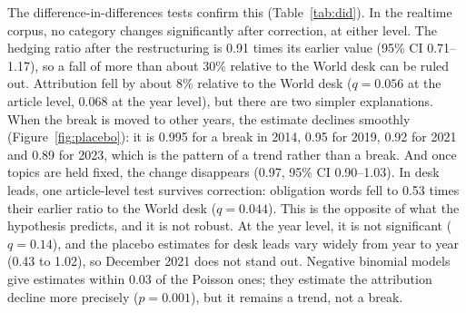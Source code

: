 \documentclass[11pt]{article}
\begin{document}
The difference-in-differences tests confirm this (Table~\ref{tab:did}). In the realtime corpus, no category changes significantly after correction, at either level. The hedging ratio after the restructuring is 0.91 times its earlier value (95\% CI 0.71--1.17), so a fall of more than about 30\% relative to the World desk can be ruled out. Attribution fell by about 8\% relative to the World desk ($q = 0.056$ at the article level, $0.068$ at the year level), but there are two simpler explanations. When the break is moved to other years, the estimate declines smoothly (Figure~\ref{fig:placebo}): it is 0.995 for a break in 2014, 0.95 for 2019, 0.92 for 2021 and 0.89 for 2023, which is the pattern of a trend rather than a break. And once topics are held fixed, the change disappears (0.97, 95\% CI 0.90--1.03). In desk leads, one article-level test survives correction: obligation words fell to 0.53 times their earlier ratio to the World desk ($q = 0.044$). This is the opposite of what the hypothesis predicts, and it is not robust. At the year level, it is not significant ($q = 0.14$), and the placebo estimates for desk leads vary widely from year to year (0.43 to 1.02), so December 2021 does not stand out. Negative binomial models give estimates within 0.03 of the Poisson ones; they estimate the attribution decline more precisely ($p = 0.001$), but it remains a trend, not a break.
\end{document}
